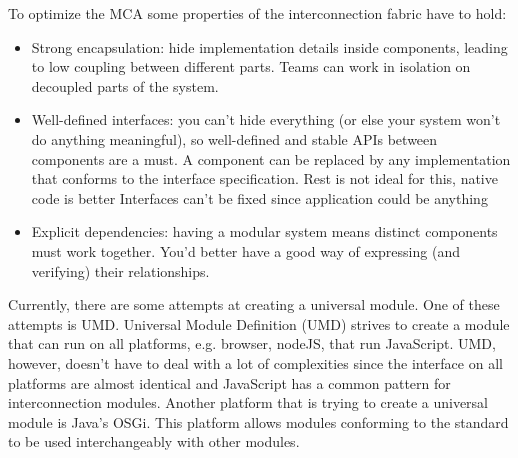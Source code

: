 To optimize the MCA some properties of the interconnection fabric have to hold:
\begin{itemize}
	\item Strong encapsulation: hide implementation details inside components, leading to low coupling between different parts. Teams can work in isolation on decoupled parts of the system.
	\item Well-defined interfaces: you can’t hide everything (or else your system won’t do anything meaningful), so well-defined and stable APIs between components are a must. A component can be replaced by any implementation that conforms to the interface specification. Rest is not ideal for this, native code is better Interfaces can't be fixed since application could be anything
	\item Explicit dependencies: having a modular system means distinct components must work together. You’d better have a good way of expressing (and verifying) their relationships.
\end{itemize}

Currently, there are some attempts at creating a universal module. One of these attempts is UMD. Universal Module Definition (UMD) strives to create a module that can run on all platforms, e.g. browser, nodeJS, that run JavaScript. UMD, however, doesn't have to deal with a lot of complexities since the interface on all platforms are almost identical and JavaScript has a common pattern for interconnection modules. Another platform that is trying to create a universal module is Java's OSGi. This platform allows modules conforming to the standard to be used interchangeably with other modules. 




